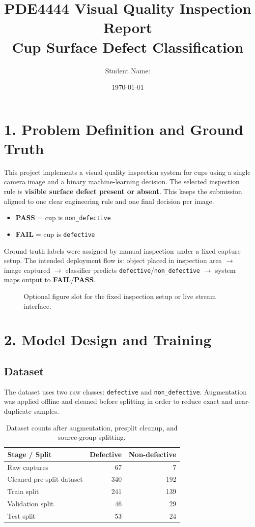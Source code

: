 \documentclass[11pt,a4paper]{article}
\title{PDE4444 Visual Quality Inspection Report\\Cup Surface Defect Classification}
\author{Student Name: \underline{\hspace{5cm}}}
\date{\today}
\begin{document}
\maketitle

\section*{1. Problem Definition and Ground Truth}
This project implements a visual quality inspection system for cups using a single camera image and a binary machine-learning decision. The selected inspection rule is \textbf{visible surface defect present or absent}. This keeps the submission aligned to one clear engineering rule and one final decision per image.

\begin{itemize}[leftmargin=*]
  \item \textbf{PASS} = cup is \texttt{non\_defective}
  \item \textbf{FAIL} = cup is \texttt{defective}
\end{itemize}

Ground truth labels were assigned by manual inspection under a fixed capture setup. The intended deployment flow is: object placed in inspection area $\rightarrow$ image captured $\rightarrow$ classifier predicts \texttt{defective}/\texttt{non\_defective} $\rightarrow$ system maps output to \textbf{FAIL}/\textbf{PASS}.

\begin{figure}[H]
\centering
{}
\caption{Optional figure slot for the fixed inspection setup or live stream interface.}
\end{figure}

\section*{2. Model Design and Training}
\subsection*{Dataset}
The dataset uses two raw classes: \texttt{defective} and \texttt{non\_defective}. Augmentation was applied offline and cleaned before splitting in order to reduce exact and near-duplicate samples.

\begin{table}[H]
\centering
\begin{tabular}{lrr}
\toprule
\textbf{Stage / Split} & \textbf{Defective} & \textbf{Non-defective} \\
\midrule
Raw captures & 67 & 7 \\
Cleaned pre-split dataset & 340 & 192 \\
Train split & 241 & 139 \\
Validation split & 46 & 29 \\
Test split & 53 & 24 \\
\bottomrule
\end{tabular}
\caption{Dataset counts after augmentation, presplit cleanup, and source-group splitting.}
\end{table}
\end{document}
